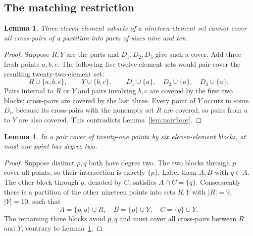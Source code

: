 \documentclass[11pt,letterpaper]{article}
\newtheorem{lemma}[theorem]{Lemma}
\theoremstyle{definition}\newtheorem{definition}[theorem]{Definition}
\theoremstyle{remark}\newtheorem{remark}[theorem]{Remark}
\begin{document}
\subsection{The matching restriction}
\begin{lemma}\label{lem:nineteen-grid}
Three eleven-element subsets of a nineteen-element set cannot cover all cross-pairs of a partition into parts of sizes nine and ten.
\end{lemma}
\begin{proof}
Suppose $R,Y$ are the parts and $D_1,D_2,D_3$ give such a cover. Add three fresh points $a,b,c$. The following five twelve-element sets would pair-cover the resulting twenty-two-element set:
\[
 R\cup\{a,b,c\},\qquad Y\cup\{b,c\},\qquad
 D_1\cup\{a\},\quad D_2\cup\{a\},\quad D_3\cup\{a\}.
\]
Pairs internal to $R$ or $Y$ and pairs involving $b,c$ are covered by the first two blocks; cross-pairs are covered by the last three. Every point of $Y$ occurs in some $D_i$, because its cross-pairs with the nonempty set $R$ are covered, so pairs from $a$ to $Y$ are also covered. This contradicts Lemma~\ref{lem:pairfloor}.
\end{proof}

\begin{samepage}
\begin{lemma}\label{lem:two-low}
In a pair cover of twenty-one points by six eleven-element blocks, at most one point has degree two.
\end{lemma}
\begin{proof}
Suppose distinct $p,q$ both have degree two. The two blocks through $p$ cover all points, so their intersection is exactly $\{p\}$. Label them $A,B$ with $q\in A$. The other block through $q$, denoted by $C$, satisfies $A\cap C=\{q\}$. Consequently there is a partition of the other nineteen points into sets $R,Y$ with $|R|=9$, $|Y|=10$, such that
\[
 A=\{p,q\}\cup R,\quad B=\{p\}\cup Y,\quad C=\{q\}\cup Y.
\]
The remaining three blocks avoid $p,q$ and must cover all cross-pairs between $R$ and $Y$, contrary to Lemma~\ref{lem:nineteen-grid}.
\end{proof}
\end{samepage}
\end{document}
